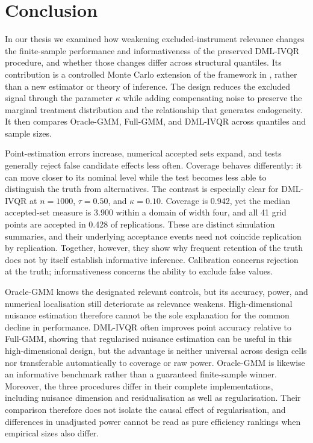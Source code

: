 \section{Conclusion}

In our thesis we examined how weakening excluded-instrument relevance changes the finite-sample performance and informativeness of the preserved DML-IVQR procedure, and whether those changes differ across structural quantiles. Its contribution is a controlled Monte Carlo extension of the framework in \textcite{chen_huang_tien_2021}, rather than a new estimator or theory of inference. The design reduces the excluded signal through the parameter $\kappa$ while adding compensating noise to preserve the marginal treatment distribution and the relationship that generates endogeneity. It then compares Oracle-GMM, Full-GMM, and DML-IVQR across quantiles and sample sizes.

Point-estimation errors increase, numerical accepted sets expand, and tests generally reject false candidate effects less often. Coverage behaves differently: it can move closer to its nominal level while the test becomes less able to distinguish the truth from alternatives. The contrast is especially clear for DML-IVQR at $n=1000$, $\tau=0.50$, and $\kappa=0.10$. Coverage is 0.942, yet the median accepted-set measure is 3.900 within a domain of width four, and all 41 grid points are accepted in 0.428 of replications. These are distinct simulation summaries, and their underlying acceptance events need not coincide replication by replication. Together, however, they show why frequent retention of the truth does not by itself establish informative inference. Calibration concerns rejection at the truth; informativeness concerns the ability to exclude false values.

Oracle-GMM knows the designated relevant controls, but its accuracy, power, and numerical localisation still deteriorate as relevance weakens. High-dimensional nuisance estimation therefore cannot be the sole explanation for the common decline in performance. DML-IVQR often improves point accuracy relative to Full-GMM, showing that regularised nuisance estimation can be useful in this high-dimensional design, but the advantage is neither universal across design cells nor transferable automatically to coverage or raw power. Oracle-GMM is likewise an informative benchmark rather than a guaranteed finite-sample winner. Moreover, the three procedures differ in their complete implementations, including nuisance dimension and residualisation as well as regularisation. Their comparison therefore does not isolate the causal effect of regularisation, and differences in unadjusted power cannot be read as pure efficiency rankings when empirical sizes also differ.

